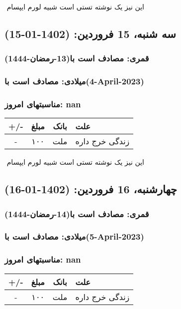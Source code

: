 \documentclass{article}
\newcommand{\rnote}[1]{\marginpar{\textcolor{color}{\StrSubstitute{\##1}{ }{\_}}}}
\newcommand{\myRow}[4]{
    #1 & #2 & #3 & #4 \\ \hline
}
\begin{document}
‌
\rnote{تست}
این نیز یک نوشته تستی است شبیه لورم ایپسام




\newpage
{}
\textcolor{color}{
\section{ سه شنبه، 15 فروردین: (1402-01-15) }
\subsubsection*{قمری: مصادف است با(13-رمضان-1444)} 
\subsubsection*{میلادی: مصادف است با(4-April-2023)}
\subsubsection*{مناسبتهای امروز: nan}
}


\begin{tabular}{ | c | c | c | p{5cm} |}
    \hline
    \myRow{ +/- }{مبلغ}{بانک}{علت}
    \myRow{-}{۱۰۰}{ملت}{زندگی خرج داره}
\end{tabular}
\newline
\newline

‌
\rnote{تست}
این نیز یک نوشته تستی است شبیه لورم ایپسام




\newpage
{}
\textcolor{color}{
\section{ چهارشنبه، 16 فروردین: (1402-01-16) }
\subsubsection*{قمری: مصادف است با(14-رمضان-1444)} 
\subsubsection*{میلادی: مصادف است با(5-April-2023)}
\subsubsection*{مناسبتهای امروز: nan}
}


\begin{tabular}{ | c | c | c | p{5cm} |}
    \hline
    \myRow{ +/- }{مبلغ}{بانک}{علت}
    \myRow{-}{۱۰۰}{ملت}{زندگی خرج داره}
\end{tabular}
\newline
\newline
\end{document}
